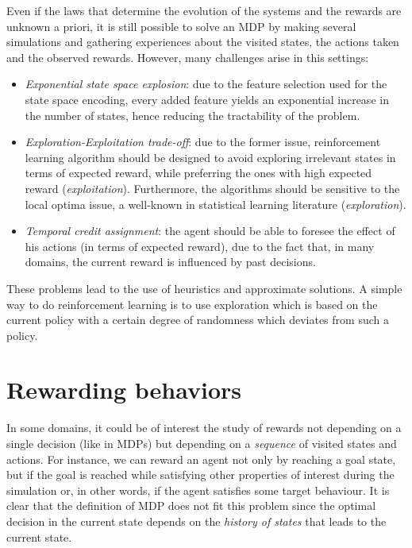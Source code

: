 \medskip
Even if the laws that determine the evolution of the systems and the rewards are unknown a priori, it is still possible to solve an MDP by making several simulations and gathering experiences about the visited states, the actions taken and the observed rewards. However, many challenges arise in this settings:
\begin{itemize}
	\item \emph{Exponential state space explosion}: due to the feature selection used for the state space encoding, every added feature yields an exponential increase in the number of states, hence reducing the tractability of the problem.
	\item \emph{Exploration-Exploitation trade-off}: due to the former issue, reinforcement learning algorithm should be designed to avoid exploring irrelevant states in terms of expected reward, while preferring the ones with high expected reward (\emph{exploitation}). Furthermore, the algorithms should be sensitive to the local optima issue, a well-known in statistical learning literature (\emph{exploration}).
	\item \emph{Temporal credit assignment}: the agent should be able to foresee the effect of his actions (in terms of expected reward), due to the fact that, in many domains, the current reward is influenced by past decisions.
\end{itemize}

These problems lead to the use of heuristics and approximate solutions. A simple way to do reinforcement learning is to use exploration which is based on the current policy with a certain degree of randomness which deviates from such a policy.

\section{Rewarding behaviors}\label{sect:intro-rewarding-behaviors}
In some domains, it could be of interest the study of rewards not depending on a single decision (like in MDPs) but depending on a \emph{sequence} of visited states and actions. For instance, we can reward an agent not only by reaching a goal state, but if the goal is reached while satisfying other properties of interest during the simulation or, in other words, if the agent satisfies some target behaviour. It is clear that the definition of MDP does not fit this problem since the optimal decision in the current state depends on the \emph{history of states} that leads to the current state.

